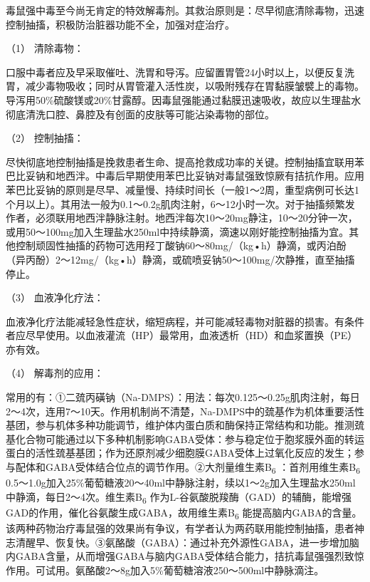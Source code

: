 毒鼠强中毒至今尚无肯定的特效解毒剂。其救治原则是：尽早彻底清除毒物，迅速控制抽搐，积极防治脏器功能不全，加强对症治疗。

\hypertarget{text00144.htmlux5cux23CHP5-3-6-1-1-1}{}
（1） 清除毒物：

口服中毒者应及早采取催吐、洗胃和导泻。应留置胃管24小时以上，以便反复洗胃，减少毒物吸收；同时从胃管灌入活性炭，以吸附残存在胃黏膜皱襞上的毒物。导泻用50\%硫酸镁或20\%甘露醇。因毒鼠强能通过黏膜迅速吸收，故应以生理盐水彻底清洗口腔、鼻腔及有创面的皮肤等可能沾染毒物的部位。

\hypertarget{text00144.htmlux5cux23CHP5-3-6-1-1-2}{}
（2） 控制抽搐：

尽快彻底地控制抽搐是挽救患者生命、提高抢救成功率的关键。控制抽搐宜联用苯巴比妥钠和地西泮。中毒后早期使用苯巴比妥钠对毒鼠强致惊厥有拮抗作用。应用苯巴比妥钠的原则是尽早、减量慢、持续时间长（一般1～2周，重型病例可长达1个月以上）。其用法一般为0.1～0.2g肌肉注射，6～12小时一次。对于抽搐频繁发作者，必须联用地西泮静脉注射。地西泮每次10～20mg静注，10～20分钟一次，或用50～100mg加入生理盐水250ml中持续静滴，滴速以刚好能控制抽搐为宜。其他控制顽固性抽搐的药物可选用羟丁酸钠60～80mg/（kg•h）静滴，或丙泊酚（异丙酚）2～12mg/（kg•h）静滴，或硫喷妥钠50～100mg/次静推，直至抽搐停止。

\hypertarget{text00144.htmlux5cux23CHP5-3-6-1-1-3}{}
（3） 血液净化疗法：

血液净化疗法能减轻急性症状，缩短病程，并可能减轻毒物对脏器的损害。有条件者应尽早使用。以血液灌流（HP）最常用，血液透析（HD）和血浆置换（PE）亦有效。

\hypertarget{text00144.htmlux5cux23CHP5-3-6-1-1-4}{}
（4） 解毒剂的应用：

常用的有：①二巯丙磺钠（Na-DMPS）：用法：每次0.125～0.25g肌肉注射，每日2～4次，连用7～10天。作用机制尚不清楚，Na-DMPS中的巯基作为机体重要活性基团，参与机体多种功能调节，维护体内蛋白质和酶保持正常结构和功能。推测巯基化合物可能通过以下多种机制影响GABA受体：参与稳定位于胞浆膜外面的转运蛋白的活性巯基基团；作为还原剂减少细胞膜GABA受体上过氧化反应的发生；参与配体和GABA受体结合位点的调节作用。②大剂量维生素B\textsubscript{6}
：首剂用维生素B\textsubscript{6}
0.5～1.0g加入25\%葡萄糖液20～40ml中静脉注射，续以1～2g加入生理盐水250ml中静滴，每日2～4次。维生素B\textsubscript{6}
作为L-谷氨酸脱羧酶（GAD）的辅酶，能增强GAD的作用，催化谷氨酸生成GABA，故用维生素B\textsubscript{6}
能提高脑内GABA的含量。该两种药物治疗毒鼠强的效果尚有争议，有学者认为两药联用能控制抽搐，患者神志清醒早、恢复快。③氨酪酸（GABA）：通过补充外源性GABA，进一步增加脑内GABA含量，从而增强GABA与脑内GABA受体结合能力，拮抗毒鼠强强烈致惊作用。可试用。氨酪酸2～8g加入5\%葡萄糖溶液250～500ml中静脉滴注。

